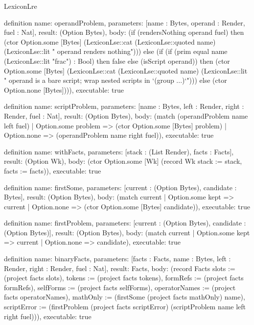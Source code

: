 \begin{lexlean}{LexiconLre}
\begin{semanticmodule}
definition{
  name: operandProblem,
  parameters: [name : Bytes, operand : Render, fuel : Nat],
  result: (Option Bytes),
  body: (if (rendersNothing operand fuel) then (ctor Option.some [Bytes] (LexiconLse::cat (LexiconLse::quoted name) (LexiconLse::lit " operand renders nothing"))) else (if (if (prim equal name (LexiconLse::lit "frac") : Bool) then false else (isScript operand)) then (ctor Option.some [Bytes] (LexiconLse::cat (LexiconLse::quoted name) (LexiconLse::lit " operand is a bare script; wrap nested scripts in `(group ...)`"))) else (ctor Option.none [Bytes]))),
  executable: true
}

definition{
  name: scriptProblem,
  parameters: [name : Bytes, left : Render, right : Render, fuel : Nat],
  result: (Option Bytes),
  body: (match (operandProblem name left fuel)
    | Option.some problem => (ctor Option.some [Bytes] problem)
    | Option.none => (operandProblem name right fuel)),
  executable: true
}

definition{
  name: withFacts,
  parameters: [stack : (List Render), facts : Facts],
  result: (Option Wk),
  body: (ctor Option.some [Wk] (record Wk {stack := stack, facts := facts})),
  executable: true
}

definition{
  name: firstSome,
  parameters: [current : (Option Bytes), candidate : Bytes],
  result: (Option Bytes),
  body: (match current
    | Option.some kept => current
    | Option.none => (ctor Option.some [Bytes] candidate)),
  executable: true
}

definition{
  name: firstProblem,
  parameters: [current : (Option Bytes), candidate : (Option Bytes)],
  result: (Option Bytes),
  body: (match current | Option.some kept => current | Option.none => candidate),
  executable: true
}

definition{
  name: binaryFacts,
  parameters: [facts : Facts, name : Bytes, left : Render, right : Render, fuel : Nat],
  result: Facts,
  body: (record Facts {slots := (project facts slots), tokens := (project facts tokens), formRefs := (project facts formRefs), selfForms := (project facts selfForms), operatorNames := (project facts operatorNames), mathOnly := (firstSome (project facts mathOnly) name), scriptError := (firstProblem (project facts scriptError) (scriptProblem name left right fuel))}),
  executable: true
}


\end{semanticmodule}
\end{lexlean}
